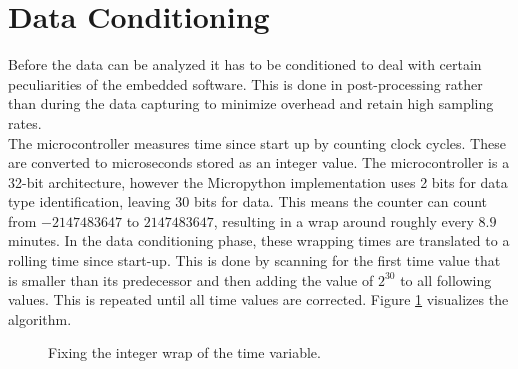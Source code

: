 \section{Data Conditioning}

Before the data can be analyzed it has to be conditioned to deal with certain peculiarities of the embedded software. This is done in post-processing rather than during the data capturing to minimize overhead and retain high sampling rates.\\

The microcontroller measures time since start up by counting clock cycles. These are converted to microseconds stored as an integer value. The microcontroller is a 32-bit architecture, however the Micropython implementation uses 2 bits for data type identification, leaving 30 bits for data. This means the counter can count from $-2147483647$ to $2147483647$, resulting in a wrap around roughly every $8.9$ minutes. In the data conditioning phase, these wrapping times are translated to a rolling time since start-up. This is done by scanning for the first time value that is smaller than its predecessor and then adding the value of $2^{30}$ to all following values. This is repeated until all time values are corrected. Figure \ref{fig:wrap} visualizes the algorithm.\\

\begin{figure}[H]
	\begin{center}
		\caption{Fixing the integer wrap of the time variable.}
		\label{fig:wrap}
	\end{center}
\end{figure}

